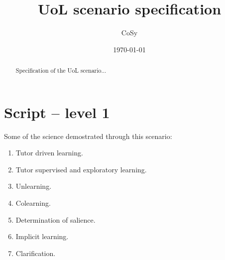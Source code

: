 \documentclass{article}
\title{UoL scenario specification}
\date{\today}
\author{CoSy}
\begin{document}
\maketitle
\begin{abstract}
Specification of the UoL scenario...
\end{abstract}


\section{Script -- level 1}
Some of the science demostrated through this scenario:
\begin{enumerate}
\item Tutor driven learning.
\item Tutor supervised and exploratory learning.
\item Unlearning.
\item Colearning.
\item Determination of salience.
\item Implicit learning.
\item Clarification.
\end{enumerate}
\end{document}
